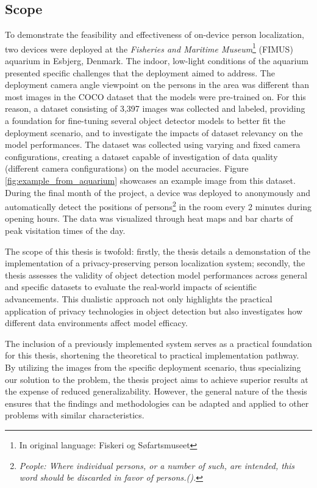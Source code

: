 \subsection{Scope}
\label{sec:scope}
To demonstrate the feasibility and effectiveness of on-device person localization, two devices were deployed at the \textit{Fisheries and Maritime Museum}\footnote{In original language: Fiskeri og Søfartsmuseet} (FIMUS) aquarium in Esbjerg, Denmark. The indoor, low-light conditions of the aquarium presented specific challenges that the deployment aimed to address. The deployment camera angle viewpoint on the persons in the area was different than most images in the COCO dataset that the models were pre-trained on. For this reason, a dataset consisting of 3,397 images was collected and labeled, providing a foundation for fine-tuning several object detector models to better fit the deployment scenario, and to investigate the impacts of dataset relevancy on the model performances. The dataset was collected using varying and fixed camera configurations, creating a dataset capable of investigation of data quality (different camera configurations) on the model accuracies. Figure \ref{fig:example_from_aquarium} showcases an example image from this dataset. During the final month of the project, a device was deployed to anonymously and automatically detect the positions of persons\footnote{\textit{People: Where individual persons, or a number of such, are intended, this word should be discarded in favor of persons.(\cite{vizetelly2015deskbook}).}} in the room every 2 minutes during opening hours. The data was visualized through heat maps and bar charts of peak visitation times of the day. 

The scope of this thesis is twofold: firstly, the thesis details a demonstation of the implementation of a privacy-preserving person localization system; secondly, the thesis assesses the validity of object detection model performances across general and specific datasets to evaluate the real-world impacts of scientific advancements. This dualistic approach not only highlights the practical application of privacy technologies in object detection but also investigates how different data environments affect model efficacy.

The inclusion of a previously implemented system serves as a practical foundation for this thesis, shortening the theoretical to practical implementation pathway. By utilizing the images from the specific deployment scenario, thus specializing our solution to the problem, the thesis project aims to achieve superior results at the expense of reduced generalizability. However, the general nature of the thesis ensures that the findings and methodologies can be adapted and applied to other problems with similar characteristics.

